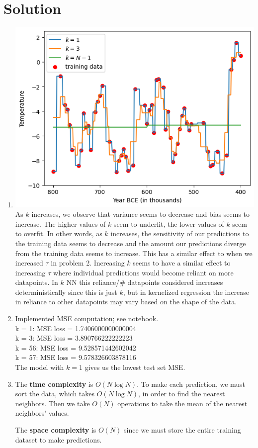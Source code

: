 \documentclass[submit]{harvardml}
\newenvironment{solution}
  {\color{blue}\section*{Solution}}
{}
\begin{document}
\begin{solution}

\begin{enumerate}
    \item 
    \includegraphics[scale=0.8]{images/p2.1.png}\\
    As $k$ increases, we observe that variance seems to decrease and bias seems to increase. The higher values of $k$ seem to underfit, the lower values of $k$ seem to overfit. In other words, as $k$ increases, the sensitivity of our predictions to the training data seems to decrease and the amount our predictions diverge from the training data seems to increase. 
    This has a similar effect to when we increased $\tau$ in problem 2. Increasing $k$ seems to have a similar effect to increasing $\tau$ where individual predictions would become reliant on more datapoints. In $k$ NN this reliance/\# datapoints considered increases deterministically since this is just $k$, but in kernelized regression the increase in reliance to other datapoints may vary based on the shape of the data.
    \item Implemented MSE computation; see notebook.\\

    k = 1: MSE loss = 1.7406000000000004\\
k = 3: MSE loss = 3.890766222222223\\
k = 56: MSE loss = 9.528571442602042\\
k = 57: MSE loss = 9.578326603878116\\

    The model with $k=1$ gives us the lowest test set MSE.
    \item The \textbf{time complexity} is $O(N\log N)$. To make each prediction, we must sort the data, which takes $O(N\log N)$, in order to find the nearest neighbors. Then we take $O(N)$ operations to take the mean of the nearest neighbors' values. 

    The \textbf{space complexity} is $O(N)$ since we must store the entire training dataset to make predictions.
\end{enumerate}
\end{solution}
\end{document}
